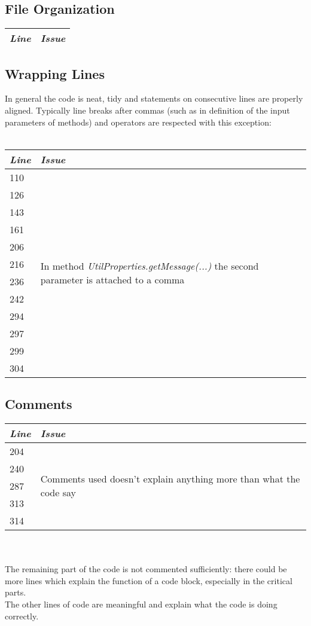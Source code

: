 \documentclass[11pt,a4paper]{report}
\begin{document}
\subsection{File Organization}
\begin{tabularx}{\textwidth}{|l|X|}
	\hline
	\textit{Line} & \textit{Issue}\\
	\hline
\end{tabularx}
\subsection{Wrapping Lines}
In general the code is neat, tidy and statements on consecutive lines are properly aligned. Typically line breaks after commas (such as in definition of the input parameters of methods) and operators are respected with this exception:
\\\\
\begin{tabularx}{\textwidth}{|l|X|}
	\hline
	\textit{Line} & \textit{Issue}\\
	\hline
	110 & \multirow{12}{\linewidth}{In method \textit{UtilProperties.getMessage(...)} the second parameter is attached to a comma}\\
	126 & \\
	143 & \\
	161 & \\
	206 & \\
	216 & \\
	236 & \\
	242 & \\
	294 & \\
	297 & \\
	299 & \\
	304 & \\
	\hline
\end{tabularx}
\subsection{Comments}
\begin{tabularx}{\textwidth}{|l|X|}
	\hline
	\textit{Line} & \textit{Issue}\\
	\hline
	204 & \multirow{5}{\linewidth}{Comments used doesn't explain anything more than what the code say}\\
	240 & \\
	287 & \\
	313 & \\
	314 & \\
	\hline
\end{tabularx}
\\\\
The remaining part of the code is not commented sufficiently: there could be more lines which explain the function of a code block, especially in the critical parts.\\The other lines of code are meaningful and explain what the code is doing correctly.
\end{document}
